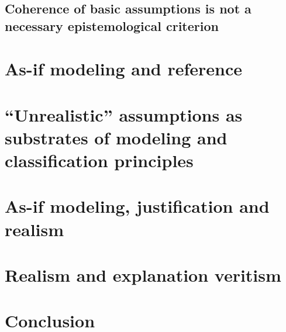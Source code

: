 \documentclass[a4paper,11pt]{article}
\begin{document}
\subsection{Coherence of basic assumptions is not a necessary epistemological criterion}

\section{As-if modeling and reference}

\section{``Unrealistic'' assumptions as substrates of modeling and classification principles }

\section{As-if modeling, justification and realism}

\section{Realism and explanation veritism}

\section{Conclusion}

 

\end{document}
